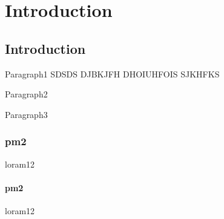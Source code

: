 
\chapter{Introduction} %

\label{c1} %
\lipsum[124]

\section{Introduction}
\par Paragraph1
SDSDS DJBKJFH DHOIUHFOIS SJKHFKS \cite{drewil2022air}
\par Paragraph2
\par Paragraph3









\subsection{pm2}
loram12
\subsubsection{pm2}
loram12